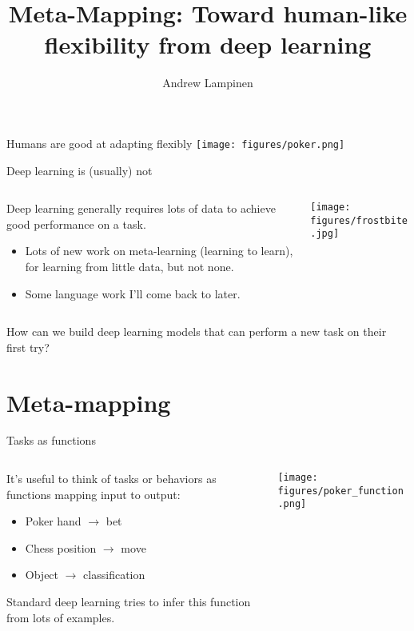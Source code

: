 \documentclass{beamer}
\begin{document}
\title{Meta-Mapping: Toward human-like flexibility from deep learning}
\author{Andrew Lampinen}
\date{}
\frame{\titlepage}

\begin{frame}{Humans are good at adapting flexibly}
\centering
\texttt{[image: figures/poker.png]}
\end{frame}

\begin{frame}{Deep learning is (usually) not}
\begin{columns}
\begin{column}{0.5\textwidth}
Deep learning generally requires lots of data to achieve good performance on a task.
\begin{itemize}
    \item<3-> Lots of new work on meta-learning (learning to learn), for learning from little data, but not none.
    \item<4-> Some language work I'll come back to later.
\end{itemize}
\end{column}

\begin{column}{0.5\textwidth}
\texttt{[image: figures/frostbite.jpg]}
\end{column}
\end{columns}
\end{frame}

\begin{frame}[standout]
How can we build deep learning models that can perform a new task on their first try?
\end{frame}

\section{Meta-mapping}

\begin{frame}{Tasks as functions}
\begin{columns}
\begin{column}{0.5\textwidth}
It's useful to think of tasks or behaviors as functions mapping input to output:
\begin{itemize}
    \item Poker hand \(\rightarrow\) bet
    \item Chess position \(\rightarrow\) move
    \item Object \(\rightarrow\) classification
\end{itemize}
Standard deep learning tries to infer this function from lots of examples. 
\end{column}

\begin{column}{0.5\textwidth}
\texttt{[image: figures/poker\_function.png]}
\end{column}
\end{columns}
\end{frame}
\end{document}
